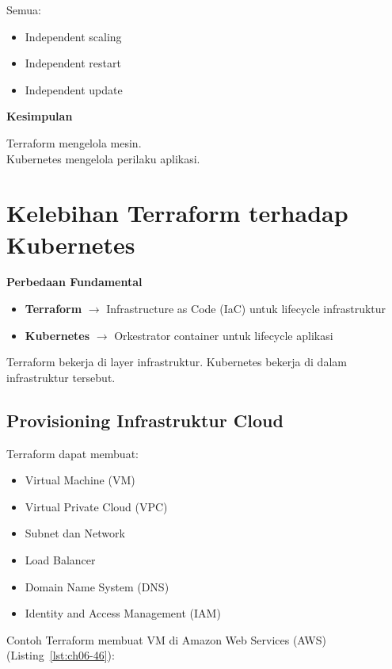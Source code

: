 Semua:
\begin{itemize}
    \item Independent scaling
    \item Independent restart
    \item Independent update
\end{itemize}

\textbf{Kesimpulan}

Terraform mengelola mesin. \\
Kubernetes mengelola perilaku aplikasi.


\section{Kelebihan Terraform terhadap Kubernetes}

\textbf{Perbedaan Fundamental}

\begin{itemize}
    \item \textbf{Terraform} $\rightarrow$ Infrastructure as Code (IaC) untuk lifecycle infrastruktur
    \item \textbf{Kubernetes} $\rightarrow$ Orkestrator container untuk lifecycle aplikasi
\end{itemize}

Terraform bekerja di layer infrastruktur.
Kubernetes bekerja di dalam infrastruktur tersebut.

\subsection{Provisioning Infrastruktur Cloud}

Terraform dapat membuat:

\begin{itemize}
    \item Virtual Machine (VM)
    \item Virtual Private Cloud (VPC)
    \item Subnet dan Network
    \item Load Balancer
    \item Domain Name System (DNS)
    \item Identity and Access Management (IAM)
\end{itemize}

Contoh Terraform membuat VM di Amazon Web Services (AWS) (Listing~\ref{lst:ch06-46}):

